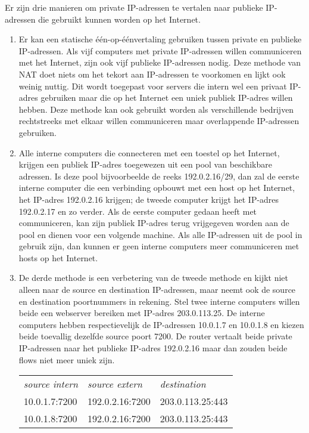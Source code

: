 Er zijn drie manieren om private IP-adressen te vertalen naar publieke IP-adressen die gebruikt kunnen worden op het Internet.
\begin{enumerate}
\item
   Er kan een statische één-op-éénvertaling gebruiken tussen private en publieke IP-adressen.
   Als vijf computers met private IP-adressen willen communiceren met het Internet, zijn ook vijf publieke IP-adressen nodig.
   Deze methode van NAT doet niets om het tekort aan IP-adressen te voorkomen en lijkt ook weinig nuttig.
   Dit wordt toegepast voor servers die intern wel een privaat IP-adres gebruiken maar die op het Internet een uniek publiek IP-adres willen hebben.
   Deze methode kan ook gebruikt worden als verschillende bedrijven rechtstreeks met elkaar willen communiceren maar overlappende IP-adressen gebruiken.
\item
   Alle interne computers die connecteren met een toestel op het Internet, krijgen een publiek IP-adres toegewezen uit een pool van beschikbare adressen.
   Is deze pool bijvoorbeelde de reeks 192.0.2.16/29, dan zal de eerste interne computer die een verbinding opbouwt met een host op het Internet, het IP-adres 192.0.2.16 krijgen;
   de tweede computer krijgt het IP-adres 192.0.2.17 en zo verder.
   Als de eerste computer gedaan heeft met communiceren, kan zijn publiek IP-adres terug vrijgegeven worden aan de pool en dienen voor een volgende machine.
   Als alle IP-adressen uit de pool in gebruik zijn, dan kunnen er geen interne computers meer communiceren met hosts op het Internet.
\item
   De derde methode is een verbetering van de tweede methode en kijkt niet alleen naar de source en destination IP-adressen, maar neemt ook de source en destination poortnummers in rekening.
   Stel twee interne computers willen beide een webserver bereiken met IP-adres 203.0.113.25.
   De interne computers hebben respectievelijk de IP-adressen 10.0.1.7 en 10.0.1.8 en kiezen beide toevallig dezelfde source poort 7200.
   De router vertaalt beide private IP-adressen naar het publieke IP-adres 192.0.2.16 maar dan zouden beide flows niet meer uniek zijn.
   \begin{center}
   \begin{tabular}{lll}
   \textit{source intern} & \textit{source extern} & \textit{destination} \\[1ex]
   10.0.1.7:7200          & 192.0.2.16:7200        & 203.0.113.25:443 \\
   10.0.1.8:7200          & 192.0.2.16:7200        & 203.0.113.25:443 \\

\end{tabular}
\end{center}
\end{enumerate}

